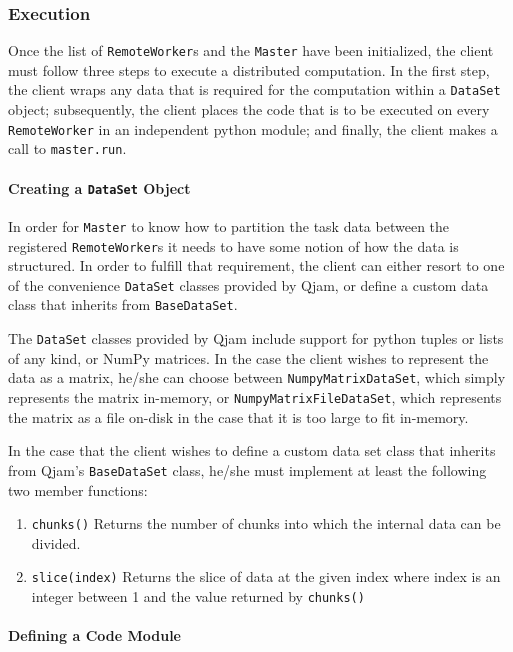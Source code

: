 \documentclass[%
  final,
  notitlepage,
  narroweqnarray,
  inline,
]{ieee}
\begin{document}
\subsubsection{Execution}

Once the list of \texttt{RemoteWorker}s and the \texttt{Master} have been
initialized, the client must follow three steps to execute a distributed
computation. In the first step, the client wraps any data that is required for
the computation within a \texttt{DataSet} object; subsequently, the client
places the code that is to be executed on every \texttt{RemoteWorker} in an
independent python module; and finally, the client makes a call to
\texttt{master.run}.

\paragraph{Creating a \texttt{DataSet} Object}
\label{DataSets}

In order for \texttt{Master} to know how to partition the task data between the
registered \texttt{RemoteWorker}s it needs to have some notion of how the data
is structured. In order to fulfill that requirement, the client can either
resort to one of the convenience \texttt{DataSet} classes provided by Qjam, or
define a custom data class that inherits from \texttt{BaseDataSet}.

The \texttt{DataSet} classes provided by Qjam include support for python tuples
or lists of any kind, or NumPy matrices. In the case the client wishes to
represent the data as a matrix, he/she can choose between
\texttt{NumpyMatrixDataSet}, which simply represents the matrix in-memory, or
\texttt{NumpyMatrixFileDataSet}, which represents the matrix as a file on-disk
in the case that it is too large to fit in-memory.

In the case that the client wishes to define a custom data set class that
inherits from Qjam's \texttt{BaseDataSet} class, he/she must implement at least
the following two member functions:
\begin{enumerate}
  \item
    \texttt{chunks()}
    Returns the number of chunks into which the internal data can be divided.
  \item
    \texttt{slice(index)}
    Returns the slice of data at the given index where index is an integer
    between 1 and the value returned by \texttt{chunks()}
\end{enumerate}


\paragraph{Defining a Code Module}
\end{document}
